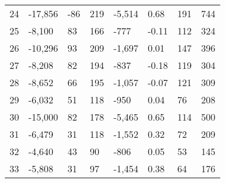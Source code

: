 \begin{appendices}
\begin{longtable}[c]{@{}llllllll@{}}
	24                       & -17,856                       & -86                          & 219                          & -5,514                   & 0.68                    & 191                  & 744                     \\
	25                       & -8,100                        & 83                           & 166                          & -777                     & -0.11                   & 112                  & 324                     \\
	26                       & -10,296                       & 93                           & 209                          & -1,697                   & 0.01                    & 147                  & 396                     \\
	27                       & -8,208                        & 82                           & 194                          & -837                     & -0.18                   & 119                  & 304                     \\
	28                       & -8,652                        & 66                           & 195                          & -1,057                   & -0.07                   & 121                  & 309                     \\
	29                       & -6,032                        & 51                           & 118                          & -950                     & 0.04                    & 76                   & 208                     \\
	30                       & -15,000                       & 82                           & 178                          & -5,465                   & 0.65                    & 114                  & 500                     \\
	31                       & -6,479                        & 31                           & 118                          & -1,552                   & 0.32                    & 72                   & 209                     \\
	32                       & -4,640                        & 43                           & 90                           & -806                     & 0.05                    & 53                   & 145                     \\
	33                       & -5,808                        & 31                           & 97                           & -1,454                   & 0.38                    & 64                   & 176                     \\

\end{longtable}
\end{appendices}
